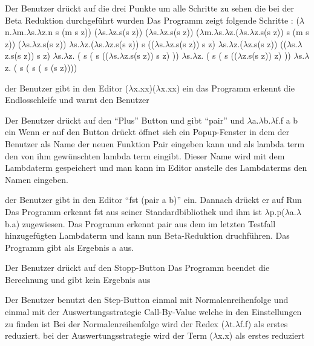 \documentclass[parskip=full,11pt,twoside]{scrartcl}
\begin{document}
{ Der Benutzer drückt auf die drei Punkte um alle Schritte zu sehen die bei der Beta Reduktion durchgeführt wurden }
{ Das Programm zeigt folgende Schritte :
\newline ($\lambda$n.$\lambda$m.$\lambda$s.$\lambda$z.n s (m s z)) ($\lambda$s.$\lambda$z.s(s z)) ($\lambda$s.$\lambda$z.s(s z))
\newline ($\lambda$m.$\lambda$s.$\lambda$z.($\lambda$s.$\lambda$z.s(s z)) s (m s z)) ($\lambda$s.$\lambda$z.s(s z))
\newline $\lambda$s.$\lambda$z.($\lambda$s.$\lambda$z.s(s z)) s (($\lambda$s.$\lambda$z.s(s z)) s z)
\newline $\lambda$s.$\lambda$z.($\lambda$z.s(s z)) (($\lambda$s.$\lambda$z.s(s z)) s z)
\newline $\lambda$s.$\lambda$z. ( s ( s (($\lambda$s.$\lambda$z.s(s z)) s z) ))
\newline $\lambda$s.$\lambda$z. ( s ( s (($\lambda$z.s(s z)) z) ))
\newline $\lambda$s.$\lambda$z. ( s ( s ( s (s z))))
 }

{der Benutzer gibt in den Editor ($\lambda$x.xx)($\lambda$x.xx) ein }
{ das Programm erkennt die Endlosschleife und warnt den Benutzer }

{ Der Benutzer drückt auf den \enquote {Plus} Button und gibt \enquote {pair} und $\lambda$a.$\lambda$b.$\lambda$f.f a b ein }
{Wenn er auf den Button drückt öffnet sich ein Popup-Fenster in dem der Benutzer als Name der neuen Funktion Pair eingeben kann und als lambda term den von ihm gewünschten lambda term eingibt. Dieser Name wird mit dem Lambdaterm gespeichert und man kann im Editor anstelle des Lambdaterms den Namen eingeben. }

{ der Benutzer gibt in den Editor \enquote {fst (pair a b)} ein. Dannach drückt er auf Run}
{ Das Programm erkennt fst aus seiner Standardbibliothek und ihm ist $\lambda$p.p($\lambda$a.$\lambda$b.a) zugewiesen. Das Programm erkennt pair aus dem im letzten Testfall hinzugefügten Lambdaterm und kann nun Beta-Reduktion druchführen. Das Programm gibt als Ergebnis a aus.}

{Der Benutzer drückt auf den Stopp-Button}
{ Das Programm beendet die Berechnung und gibt kein Ergebnis aus }

{Der Benutzer benutzt den Step-Button einmal mit Normalenreihenfolge  und einmal mit der Auswertungsstrategie Call-By-Value welche in den Einstellungen zu finden ist}
{ Bei der Normalenreihenfolge wird der Redex ($\lambda$t.$\lambda$f.f) als erstes reduziert. bei der Auswertungsstrategie wird der Term ($\lambda$x.x) als erstes reduziert }
\end{document}
